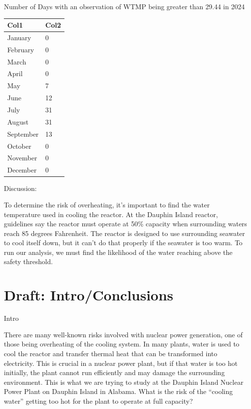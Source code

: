 \documentclass[
  letterpaper,
  DIV=11,
  numbers=noendperiod]{scrreprt}
\begin{document}
Number of Days with an observation of WTMP being greater than 29.44 in
2024

\begin{longtable}[]{@{}ll@{}}
\toprule\noalign{}
Col1 & Col2 \\
\midrule\noalign{}
\endhead
\bottomrule\noalign{}
\endlastfoot
January & 0 \\
February & 0 \\
March & 0 \\
April & 0 \\
May & 7 \\
June & 12 \\
July & 31 \\
August & 31 \\
September & 13 \\
October & 0 \\
November & 0 \\
December & 0 \\
\end{longtable}

Discussion:

To determine the risk of overheating, it's important to find the water
temperature used in cooling the reactor. At the Dauphin Island reactor,
guidelines say the reactor must operate at 50\% capacity when
surrounding waters reach 85 degrees Fahrenheit. The reactor is designed
to use surrounding seawater to cool itself down, but it can't do that
properly if the seawater is too warm. To run our analysis, we must find
the likelihood of the water reaching above the safety threshold.

\chapter{Draft: Intro/Conclusions}\label{draft-introconclusions}

Intro

There are many well-known risks involved with nuclear power generation,
one of those being overheating of the cooling system. In many plants,
water is used to cool the reactor and transfer thermal heat that can be
transformed into electricity. This is crucial in a nuclear power plant,
but if that water is too hot initially, the plant cannot run efficiently
and may damage the surrounding environment. This is what we are trying
to study at the Dauphin Island Nuclear Power Plant on Dauphin Island in
Alabama. What is the risk of the ``cooling water'' getting too hot for
the plant to operate at full capacity?
\end{document}
